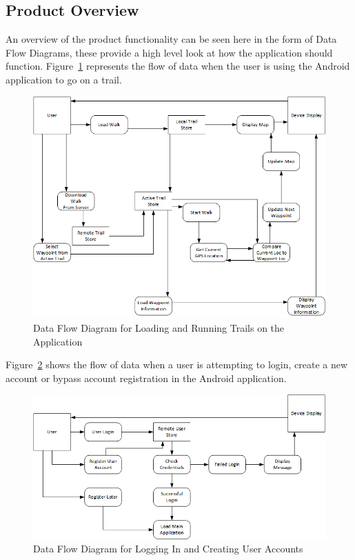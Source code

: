 \documentclass[11pt,a4paper]{article}
\begin{document}
\subsection{Product Overview}
\label{sec:product-overview}
An overview of the product functionality can be seen here in the form of Data Flow Diagrams, these provide a high level look at how the application should function. Figure~\ref{fig:walkDFD} represents the flow of data when the user is using the Android application to go on a trail.

\begin{figure}[H]
\begin{center}
\includegraphics[scale=0.65]{./img/WalkDFD}
\caption{Data Flow Diagram for Loading and Running Trails on the Application}
\label{fig:walkDFD}
\end{center}
\end{figure}

Figure~\ref{fig:userLoginDFD} shows the flow of data when a user is attempting to login, create a new account or bypass account registration in the Android application.

\begin{figure}[H]
\begin{center}
\includegraphics[scale=0.65]{userLoginDFD.png}
\caption{Data Flow Diagram for Logging In and Creating User Accounts}
\label{fig:userLoginDFD}
\end{center}
\end{figure}
\end{document}
